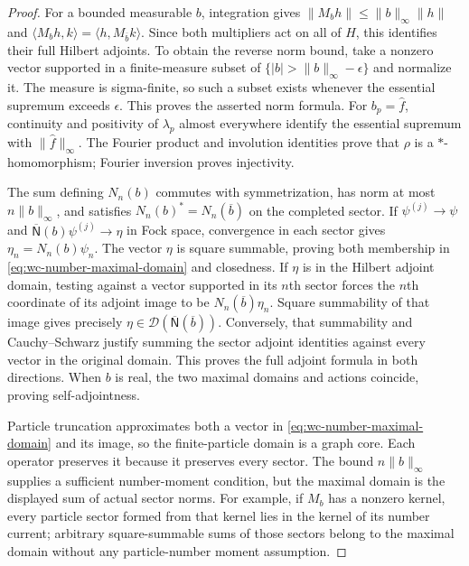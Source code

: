\documentclass[11pt]{article}
\theoremstyle{definition}
\theoremstyle{remark}
\numberwithin{equation}{section}
\begin{document}
\begin{proof}
For a bounded measurable $b$, integration gives
$\|M_bh\|\leq\|b\|_\infty\|h\|$ and
$\langle M_bh,k\rangle=\langle h,M_{\overline b}k\rangle$.
Since both multipliers act on all of $H$, this identifies their full
Hilbert adjoints.
To obtain the reverse norm bound, take a nonzero vector supported in a
finite-measure subset of
$\{|b|>\|b\|_\infty-\epsilon\}$ and normalize it.
The measure is sigma-finite, so such a subset exists whenever the
essential supremum exceeds $\epsilon$.
This proves the asserted norm formula.
For $b_p=\widehat f$, continuity and positivity of $\lambda_p$ almost
everywhere identify the essential supremum with
$\|\widehat f\|_\infty$.
The Fourier product and involution identities prove that $\rho$ is a
$*$-homomorphism; Fourier inversion proves injectivity.

The sum defining $N_n(b)$ commutes with symmetrization, has norm at most
$n\|b\|_\infty$, and satisfies
$N_n(b)^*=N_n(\overline b)$ on the completed sector.
If $\psi^{(j)}\to\psi$ and
$\overline{\mathsf N}(b)\psi^{(j)}\to\eta$ in Fock space, convergence
in each sector gives $\eta_n=N_n(b)\psi_n$.
The vector $\eta$ is square summable, proving both membership in
\eqref{eq:wc-number-maximal-domain} and closedness.
If $\eta$ is in the Hilbert adjoint domain, testing against a vector
supported in its $n$th sector forces the $n$th coordinate of its adjoint
image to be $N_n(\overline b)\eta_n$.
Square summability of that image gives precisely
$\eta\in\mathcal D(\overline{\mathsf N}(\overline b))$.
Conversely, that summability and Cauchy--Schwarz justify summing the
sector adjoint identities against every vector in the original domain.
This proves the full adjoint formula in both directions.
When $b$ is real, the two maximal domains and actions coincide, proving
self-adjointness.

Particle truncation approximates both a vector in
\eqref{eq:wc-number-maximal-domain} and its image, so the finite-particle
domain is a graph core.  Each operator preserves it because it preserves
every sector.
The bound $n\|b\|_\infty$ supplies a sufficient number-moment condition,
but the maximal domain is the displayed sum of actual sector norms.
For example, if $M_b$ has a nonzero kernel, every particle sector
formed from that kernel lies in the kernel of its number current; arbitrary
square-summable sums of those sectors belong to the maximal domain
without any particle-number moment assumption.


\end{proof}
\end{document}
